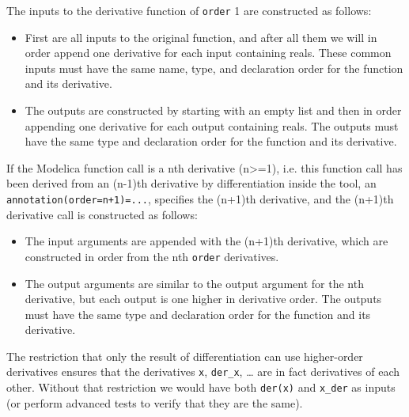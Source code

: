 The inputs to the derivative function of \lstinline!order! 1 are constructed as
follows:

\begin{itemize}
\item
  First are all inputs to the original function, and after all them we
  will in order append one derivative for each input containing reals.
  These common inputs must have the same name, type, and declaration
  order for the function and its derivative.
\item
  The outputs are constructed by starting with an empty list and then in
  order appending one derivative for each output containing reals. The
  outputs must have the same type and declaration order for the function
  and its derivative.
\end{itemize}

If the Modelica function call is a nth derivative (n\textgreater{}=1),
i.e. this function call has been derived from an (n-1)th derivative by
differentiation inside the tool, an \lstinline!annotation(order=n+1)=...!,
specifies the (n+1)th derivative, and the (n+1)th derivative call is
constructed as follows:

\begin{itemize}
\item
  The input arguments are appended with the (n+1)th derivative, which
  are constructed in order from the nth \lstinline!order! derivatives.
\item
  The output arguments are similar to the output argument for the nth
  derivative, but each output is one higher in derivative order. The
  outputs must have the same type and declaration order for the function
  and its derivative.
\end{itemize}

\begin{nonnormative}
The restriction that only the result of differentiation can use
higher-order derivatives ensures that the derivatives \lstinline!x!, \lstinline!der_x!,
\ldots{} are in fact derivatives of each other. Without that restriction
we would have both \lstinline!der(x)! and \lstinline!x_der! as inputs (or perform advanced
tests to verify that they are the same).
\end{nonnormative}


